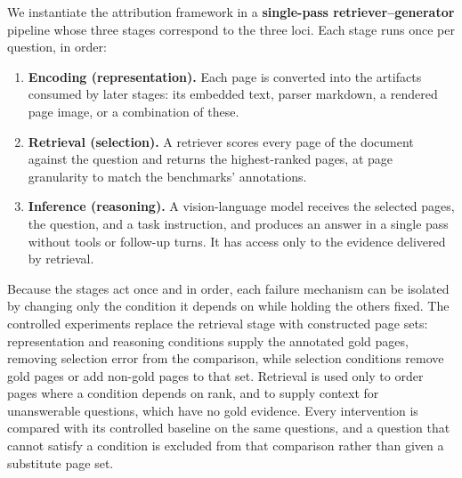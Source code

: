 We instantiate the attribution framework in a \textbf{single-pass retriever--generator} pipeline whose three stages correspond to the three loci. Each stage runs once per question, in order:

\begin{enumerate}
\item \textbf{Encoding (representation).} Each page is converted into the artifacts consumed by later stages: its embedded text, parser markdown, a rendered page image, or a combination of these.
\item \textbf{Retrieval (selection).} A retriever scores every page of the document against the question and returns the highest-ranked pages, at page granularity to match the benchmarks' annotations.
\item \textbf{Inference (reasoning).} A vision-language model receives the selected pages, the question, and a task instruction, and produces an answer in a single pass without tools or follow-up turns. It has access only to the evidence delivered by retrieval.
\end{enumerate}

Because the stages act once and in order, each failure mechanism can be isolated by changing only the condition it depends on while holding the others fixed. The controlled experiments replace the retrieval stage with constructed page sets: representation and reasoning conditions supply the annotated gold pages, removing selection error from the comparison, while selection conditions remove gold pages or add non-gold pages to that set. Retrieval is used only to order pages where a condition depends on rank, and to supply context for unanswerable questions, which have no gold evidence. Every intervention is compared with its controlled baseline on the same questions, and a question that cannot satisfy a condition is excluded from that comparison rather than given a substitute page set.




